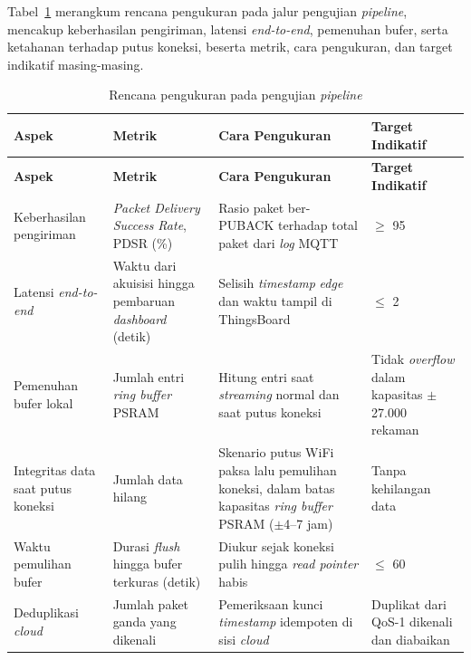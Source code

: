 Tabel~\ref{tab:pengujian-pipeline} merangkum rencana pengukuran pada jalur pengujian \textit{pipeline}, mencakup keberhasilan pengiriman, latensi \textit{end-to-end}, pemenuhan bufer, serta ketahanan terhadap putus koneksi, beserta metrik, cara pengukuran, dan target indikatif masing-masing.

\begin{center}
  \setlength{\tabcolsep}{4pt}
  \renewcommand{\arraystretch}{1.15}
  \small
  \begin{longtable}{>{\RaggedRight\arraybackslash}p{2.5cm}>{\RaggedRight\arraybackslash}p{3.2cm}>{\RaggedRight\arraybackslash}p{4.6cm}>{\RaggedRight\arraybackslash}p{2.5cm}}
    \caption{Rencana pengukuran pada pengujian \textit{pipeline}}
    \label{tab:pengujian-pipeline} \\
    \toprule
    \textbf{Aspek} & \textbf{Metrik} & \textbf{Cara Pengukuran} & \textbf{Target Indikatif} \\
    \midrule
    \endfirsthead
    \toprule
    \textbf{Aspek} & \textbf{Metrik} & \textbf{Cara Pengukuran} & \textbf{Target Indikatif} \\
    \midrule
    \endhead
    \bottomrule
    \endfoot
    Keberhasilan pengiriman &
    \textit{Packet Delivery Success Rate}, PDSR (\%) &
    Rasio paket ber-PUBACK terhadap total paket dari \textit{log} MQTT &
    $\geq$ 95 \\
    Latensi \textit{end-to-end} &
    Waktu dari akuisisi hingga pembaruan \textit{dashboard} (detik) &
    Selisih \textit{timestamp} \textit{edge} dan waktu tampil di ThingsBoard &
    $\leq$ 2 \\
    Pemenuhan bufer lokal &
    Jumlah entri \textit{ring buffer} PSRAM &
    Hitung entri saat \textit{streaming} normal dan saat putus koneksi &
    Tidak \textit{overflow} dalam kapasitas $\pm$27.000 rekaman \\
    Integritas data saat putus koneksi &
    Jumlah data hilang &
    Skenario putus WiFi paksa lalu pemulihan koneksi, dalam batas
    kapasitas \textit{ring buffer} PSRAM ($\pm$4--7 jam) &
    Tanpa kehilangan data \\
    Waktu pemulihan bufer &
    Durasi \textit{flush} hingga bufer terkuras (detik) &
    Diukur sejak koneksi pulih hingga \textit{read pointer} habis &
    $\leq$ 60 \\
    Deduplikasi \textit{cloud} &
    Jumlah paket ganda yang dikenali &
    Pemeriksaan kunci \textit{timestamp} idempoten di sisi \textit{cloud} &
    Duplikat dari QoS-1 dikenali dan diabaikan \\
  \end{longtable}
  \par\vspace{2pt}{\footnotesize\raggedright Keterangan: satuan target mengikuti satuan pada kolom Metrik. Skenario kehilangan daya perangkat berada di luar cakupan pengujian ini.\par}
\end{center}

